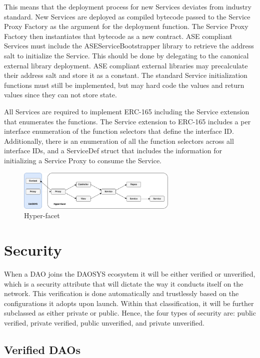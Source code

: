 \documentclass[journal,twocolumn,12pt]{ieeesyscoin}
\begin{document}
This means that the deployment process for new Services deviates from industry standard. New Services are deployed as compiled bytecode passed to the Service Proxy Factory as the argument for the deployment function. The Service Proxy Factory then instantiates that bytecode as a new contract. ASE compliant Services must include the ASEServiceBootstrapper library to retrieve the address salt to initialize the Service. This should be done by delegating to the canonical external library deployment. ASE compliant external libraries may precalculate their address salt and store it as a constant. The standard Service initialization functions must still be implemented, but may hard code the values and return values since they can not store state.

All Services are required to implement ERC-165 including the Service extension that enumerates the functions. The Service extension to ERC-165 includes a per interface enumeration of the function selectors that define the interface ID. Additionally, there is an enumeration of all the function selectors across all interface IDs, and a ServiceDef struct that includes the information for initializing a Service Proxy to consume the Service.

\begin{figure}[h!]
\includegraphics[width=3in]{img/hyper_facet.png}
\caption{Hyper-facet} 
\label{fig:hyper_facet}
\end{figure} 

\section{Security}
\label{sec:security}

When a DAO joins the DAOSYS ecosystem it will be either verified or unverified, which is a security attribute that will dictate the way it conducts itself on the network. This verification is done automatically and trustlessly based on the configurations it adopts upon launch. Within that classification, it will be further subclassed as either private or public. Hence, the four types of security are: public verified, private verified, public unverified, and private unverified.

\subsection{Verified DAOs}
\label{sec:verified}
\end{document}
